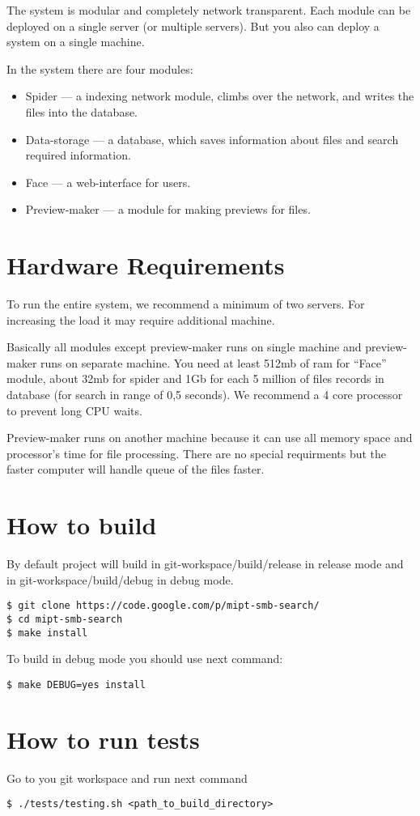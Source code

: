 \documentclass[10pt, oneside, a4paper]{scrbook}
\begin{document}
The system is modular and completely network transparent. Each module can be deployed on a single server (or multiple servers). But you also can deploy a system on a single machine.

In the system there are four modules:

\begin{itemize}
  \item Spider --- a indexing network module, climbs over the network, and writes the files into the database.
  \item Data-storage --- a database, which saves information about files and search required information.
  \item Face --- a web-interface for users.
  \item Preview-maker --- a module for making previews for files.
\end{itemize}


\section{Hardware Requirements}
To run the entire system, we recommend a minimum of two servers. For increasing the load it may require additional machine.

Basically all modules except preview-maker runs on single machine and preview-maker runs on separate machine. You need at least 512mb of ram for ``Face'' module, about 32mb for spider and 1Gb for each 5 million of files records in database (for search in range of 0,5 seconds). We recommend a 4 core processor to prevent long CPU waits.

Preview-maker runs on another machine because it can use all memory space and processor's time for file processing. There are no special requirments but the faster computer will handle queue of the files faster.

\section{How to build}\label{sec:build}

By default project will build in git-workspace/build/release in release mode and in git-workspace/build/debug in debug mode.

\begin{lstlisting}
$ git clone https://code.google.com/p/mipt-smb-search/
$ cd mipt-smb-search
$ make install
\end{lstlisting}

To build in debug mode you should use next command:

\begin{lstlisting}
$ make DEBUG=yes install
\end{lstlisting}

\section{How to run tests}\label{sec:tests}

Go to you git workspace and run next command

\begin{lstlisting}
$ ./tests/testing.sh <path_to_build_directory>
\end{lstlisting}
\end{document}

